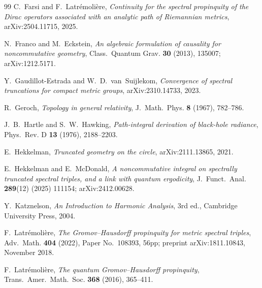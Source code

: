 \documentclass[11pt,a4paper]{article}
\theoremstyle{plain}
\theoremstyle{definition}
\begin{document}
\begin{thebibliography}{99}
C.~Farsi and F.~Latr\'emoli\`ere,
\newblock \emph{Continuity for the spectral propinquity of the Dirac
operators associated with an analytic path of Riemannian metrics},
\newblock arXiv:2504.11715, 2025.

N.~Franco and M.~Eckstein,
\newblock \emph{An algebraic formulation of causality for
noncommutative geometry},
\newblock Class.~Quantum Grav. \textbf{30} (2013), 135007;
\newblock arXiv:1212.5171.

Y.~Gaudillot-Estrada and W.~D.~van~Suijlekom,
\newblock \emph{Convergence of spectral truncations for compact metric
groups},
\newblock arXiv:2310.14733, 2023.

R.~Geroch,
\newblock \emph{Topology in general relativity},
\newblock J.~Math.~Phys. \textbf{8} (1967), 782--786.

J.~B.~Hartle and S.~W.~Hawking,
\newblock \emph{Path-integral derivation of black-hole radiance},
\newblock Phys.~Rev. D \textbf{13} (1976), 2188--2203.

E.~Hekkelman,
\newblock \emph{Truncated geometry on the circle},
\newblock arXiv:2111.13865, 2021.

E.~Hekkelman and E.~McDonald,
\newblock \emph{A noncommutative integral on spectrally truncated
spectral triples, and a link with quantum ergodicity},
\newblock J.~Funct.~Anal. \textbf{289}(12) (2025) 111154;
\newblock arXiv:2412.00628.

Y.~Katznelson,
\newblock \emph{An Introduction to Harmonic Analysis},
\newblock 3rd ed., Cambridge University Press, 2004.

F.~Latr\'emoli\`ere,
\newblock \emph{The Gromov--Hausdorff propinquity for metric spectral
triples},
\newblock Adv.~Math. \textbf{404} (2022), Paper No.~108393, 56pp;
\newblock preprint arXiv:1811.10843, November 2018.

F.~Latr\'emoli\`ere,
\newblock \emph{The quantum Gromov--Hausdorff propinquity},
\newblock Trans.~Amer.~Math.~Soc. \textbf{368} (2016), 365--411.


\end{thebibliography}
\end{document}
